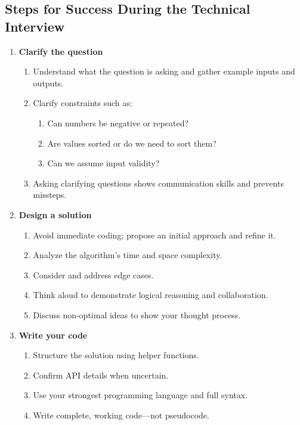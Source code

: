 \subsection{Steps for Success During the Technical Interview}
\begin{summary}
    \begin{enumerate}
        \item \textbf{Clarify the question}
        \begin{enumerate}
            \item Understand what the question is asking and gather example inputs and outputs.
            \item Clarify constraints such as:
            \begin{enumerate}
                \item Can numbers be negative or repeated?
                \item Are values sorted or do we need to sort them?
                \item Can we assume input validity?
            \end{enumerate}
            \item Asking clarifying questions shows communication skills and prevents missteps.
        \end{enumerate}

        \item \textbf{Design a solution}
        \begin{enumerate}
            \item Avoid immediate coding; propose an initial approach and refine it.
            \item Analyze the algorithm's time and space complexity.
            \item Consider and address edge cases.
            \item Think aloud to demonstrate logical reasoning and collaboration.
            \item Discuss non-optimal ideas to show your thought process.
        \end{enumerate}

        \item \textbf{Write your code}
        \begin{enumerate}
            \item Structure the solution using helper functions.
            \item Confirm API details when uncertain.
            \item Use your strongest programming language and full syntax.
            \item Write complete, working code—not pseudocode.
        \end{enumerate}


\end{enumerate}
\end{summary}
